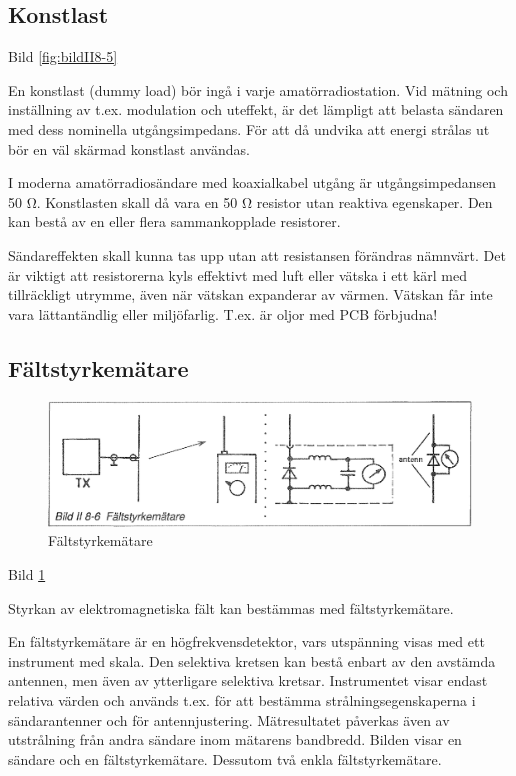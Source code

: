 \subsection{Konstlast}

Bild \ref{fig:bildII8-5}

En konstlast (dummy load) bör ingå i varje amatörradiostation.  Vid
mätning och inställning av t.ex. modulation och uteffekt, är det
lämpligt att belasta sändaren med dess nominella utgångsimpedans.  För
att då undvika att energi strålas ut bör en väl skärmad konstlast
användas.

I moderna amatörradiosändare med koaxialkabel utgång är
utgångsimpedansen 50 Ω. Konstlasten skall då vara en 50 Ω resistor
utan reaktiva egenskaper.  Den kan bestå av en eller flera
sammankopplade resistorer.

Sändareffekten skall kunna tas upp utan att resistansen förändras
nämnvärt. Det är viktigt att resistorerna kyls effektivt med luft
eller vätska i ett kärl med tillräckligt utrymme, även när vätskan
expanderar av värmen.  Vätskan får inte vara lättantändlig eller
miljöfarlig.  T.ex. är oljor med PCB förbjudna!

\subsection{Fältstyrkemätare}

\begin{figure}
  \includegraphics[width=\textwidth]{images/bild_2_8-06}
  \caption{Fältstyrkemätare}
  \label{fig:bildII8-6}
\end{figure}

Bild \ref{fig:bildII8-6}

Styrkan av elektromagnetiska fält kan bestämmas med fältstyrkemätare.

En fältstyrkemätare är en högfrekvensdetektor, vars utspänning visas
med ett instrument med skala.  Den selektiva kretsen kan bestå enbart
av den avstämda antennen, men även av ytterligare selektiva
kretsar. Instrumentet visar endast relativa värden och används
t.ex. för att bestämma strålningsegenskaperna i sändarantenner och för
antennjustering.  Mätresultatet påverkas även av utstrålning från
andra sändare inom mätarens bandbredd.  Bilden visar en sändare och en
fältstyrkemätare.  Dessutom två enkla fältstyrkemätare.

